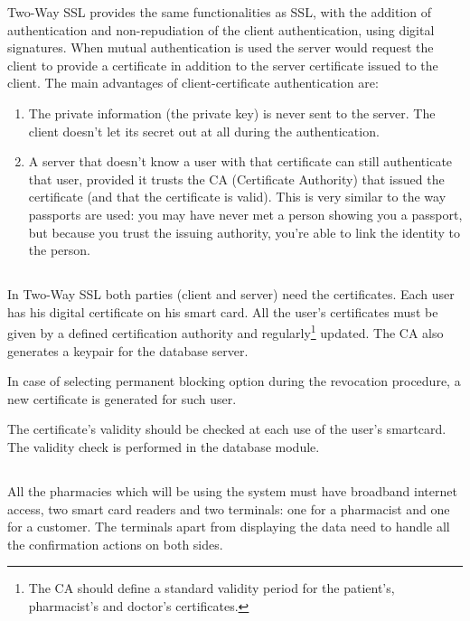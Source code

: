 Two-Way SSL provides the same functionalities as SSL, with the addition of authentication and non-repudiation of the client authentication, using digital signatures. When mutual authentication is used the server would request the client to provide a certificate in addition to the server certificate issued to the client.
The main advantages of client-certificate authentication are:
\begin{enumerate}
\item The private information (the private key) is never sent to the server. The client doesn't let its secret out at all during the authentication.
\item A server that doesn't know a user with that certificate can still authenticate that user, provided it trusts the CA (Certificate Authority) that issued the certificate (and that the certificate is valid). This is very similar to the way passports are used: you may have never met a person showing you a passport, but because you trust the issuing authority, you're able to link the identity to the person.
\end{enumerate}


\subsection{}

In Two-Way SSL both parties (client and server) need the certificates. Each user has his digital certificate on his smart card. All the user's certificates must be given by a defined certification authority and regularly\footnote{The CA should define a standard validity period for the patient's, pharmacist's and doctor's certificates.} updated. The CA also generates a keypair for the database server. 

In case of selecting permanent blocking option during the revocation procedure, a new certificate is generated for such user.

The certificate's validity should be checked at each use of the user's smartcard. The validity check is performed in the database module.



\subsection{}

All the pharmacies which will be using the system must have broadband internet access, two smart card readers and two terminals: one for a pharmacist and one for a customer. The terminals apart from displaying the data need to handle all the confirmation actions on both sides. \newline



